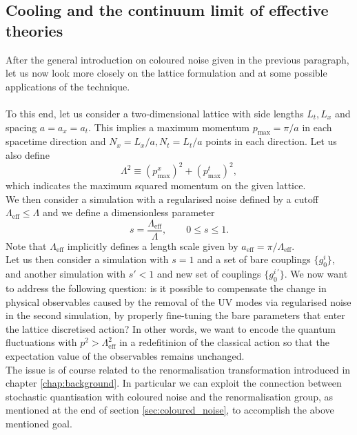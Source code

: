 \subsection{Cooling and the continuum limit of effective theories}
After the general introduction on coloured noise given in the previous paragraph, let us now look more closely on the lattice formulation and at some possible applications of the technique. \\~\\
To this end, let us consider a two-dimensional lattice with side lengths $L_t, L_x$ and spacing $a = a_x = a_t$. This implies a maximum momentum $p_\text{max} = \pi / a$ in each spacetime direction and $N_x=L_x/a, N_t=L_t/a$ points in each direction. Let us also define 
\begin{equation}
	\Lambda^2 \equiv (p^x_\text{max})^2 + (p^t_\text{max})^2,
\end{equation}
which indicates the maximum squared momentum on the given lattice. \\
We then consider a simulation with a regularised noise defined by a cutoff $\Lambda_\text{eff} \leq \Lambda$ and we define a dimensionless parameter
\begin{equation}
	s = \frac{\Lambda_\text{eff}}{\Lambda}, \qquad 0 \leq s \leq 1.
\end{equation}
Note that $\Lambda_\text{eff}$ implicitly defines a length scale given by  $a_\text{eff} = \pi/\Lambda_\text{eff}$.\\
Let us then consider a simulation with $s=1$ and a set of bare couplings $\{g^i_0\}$, and another simulation with $s'<1$ and new set of couplings $\{g^{i \, \prime}_0\}$. 
We now want to address the following question: is it possible to compensate the change in physical observables caused by the removal of the UV modes via regularised noise in the second simulation, by properly fine-tuning the bare parameters that enter the lattice discretised action? In other words, we want to encode the quantum fluctuations with $p^2 > \Lambda_\text{eff}^2$ in a redefitinion of the classical action so that the expectation value of the observables remains unchanged.\\
The issue is of course related to the renormalisation transformation introduced in chapter \ref{chap:background}. In particular we can exploit the connection between stochastic quantisation with coloured noise and the renormalisation group, as mentioned at the end of section \ref{sec:coloured_noise}, to accomplish the above mentioned goal. \\
